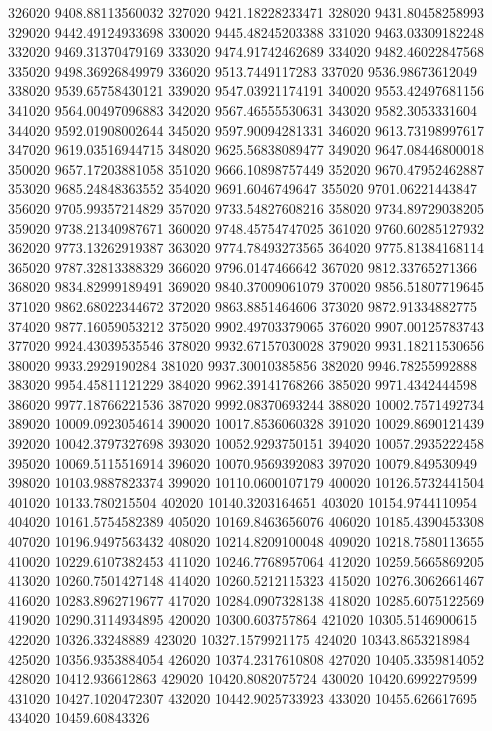 {326020 9408.88113560032
327020 9421.18228233471
328020 9431.80458258993
329020 9442.49124933698
330020 9445.48245203388
331020 9463.03309182248
332020 9469.31370479169
333020 9474.91742462689
334020 9482.46022847568
335020 9498.36926849979
336020 9513.7449117283
337020 9536.98673612049
338020 9539.65758430121
339020 9547.03921174191
340020 9553.42497681156
341020 9564.00497096883
342020 9567.46555530631
343020 9582.3053331604
344020 9592.01908002644
345020 9597.90094281331
346020 9613.73198997617
347020 9619.03516944715
348020 9625.56838089477
349020 9647.08446800018
350020 9657.17203881058
351020 9666.10898757449
352020 9670.47952462887
353020 9685.24848363552
354020 9691.6046749647
355020 9701.06221443847
356020 9705.99357214829
357020 9733.54827608216
358020 9734.89729038205
359020 9738.21340987671
360020 9748.45754747025
361020 9760.60285127932
362020 9773.13262919387
363020 9774.78493273565
364020 9775.81384168114
365020 9787.32813388329
366020 9796.0147466642
367020 9812.33765271366
368020 9834.82999189491
369020 9840.37009061079
370020 9856.51807719645
371020 9862.68022344672
372020 9863.8851464606
373020 9872.91334882775
374020 9877.16059053212
375020 9902.49703379065
376020 9907.00125783743
377020 9924.43039535546
378020 9932.67157030028
379020 9931.18211530656
380020 9933.2929190284
381020 9937.30010385856
382020 9946.78255992888
383020 9954.45811121229
384020 9962.39141768266
385020 9971.4342444598
386020 9977.18766221536
387020 9992.08370693244
388020 10002.7571492734
389020 10009.0923054614
390020 10017.8536060328
391020 10029.8690121439
392020 10042.3797327698
393020 10052.9293750151
394020 10057.2935222458
395020 10069.5115516914
396020 10070.9569392083
397020 10079.849530949
398020 10103.9887823374
399020 10110.0600107179
400020 10126.5732441504
401020 10133.780215504
402020 10140.3203164651
403020 10154.9744110954
404020 10161.5754582389
405020 10169.8463656076
406020 10185.4390453308
407020 10196.9497563432
408020 10214.8209100048
409020 10218.7580113655
410020 10229.6107382453
411020 10246.7768957064
412020 10259.5665869205
413020 10260.7501427148
414020 10260.5212115323
415020 10276.3062661467
416020 10283.8962719677
417020 10284.0907328138
418020 10285.6075122569
419020 10290.3114934895
420020 10300.603757864
421020 10305.5146900615
422020 10326.33248889
423020 10327.1579921175
424020 10343.8653218984
425020 10356.9353884054
426020 10374.2317610808
427020 10405.3359814052
428020 10412.936612863
429020 10420.8082075724
430020 10420.6992279599
431020 10427.1020472307
432020 10442.9025733923
433020 10455.626617695
434020 10459.60843326
}
